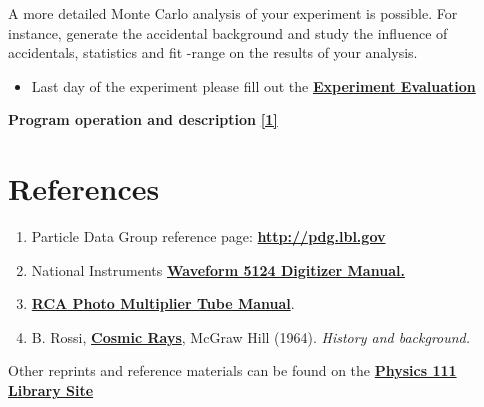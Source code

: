 \documentclass{../lab}
\begin{document}
A more detailed Monte Carlo analysis of your experiment is possible. For instance, generate the accidental background and study the influence of accidentals, statistics and fit -range on the results of your analysis.

\begin{itemize}
    \item Last day of the experiment please fill out the \href{\ExperimentEvaluation}{\textbf{Experiment Evaluation}}

\end{itemize}

\textbf{Program operation and description} \href{http://dev-physicsadv.pantheon.berkeley.edu/node/88}{\textbf{[1]}}

\section{References}
\label{sec:References}

\begin{enumerate}
    \item Particle Data Group reference page: \href{http://pdg.lbl.gov}{\textbf{http://pdg.lbl.gov}}

    \item National Instruments \href{http://dev-physicsadv.pantheon.berkeley.edu/sites/default/files/pdfs/Daq-5124.pdf}{\textbf{Waveform 5124 Digitizer Manual.}}

    \item \href{http://physics111.lib.berkeley.edu/Physics111/Equipment\_Manuals/RCA\_PMT.pdf}{\textbf{RCA Photo Multiplier Tube Manual}}.

    \item B. Rossi, \href{http://physics111.lib.berkeley.edu/Physics111/Reprints/MUO/02-Cosmic-Ray\_Phenomena.pdf}{\textbf{Cosmic Rays}}, McGraw Hill (1964). \emph{History and background.}

\end{enumerate}

\noindent Other reprints and reference materials can be found on the \href{http://physics111.lib.berkeley.edu/Physics111/Reprints/MUO/MUO\_index.html}{\textbf{Physics 111 Library Site}}
\end{document}
